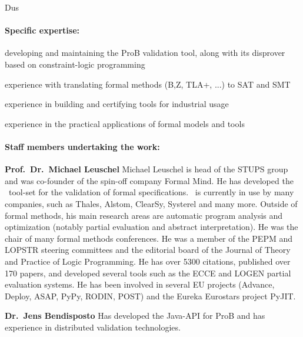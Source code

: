 \begin{sitedescription}{Dus}
\paragraph{Specific expertise:}

\begin{compactitem}
\item {}
      developing and maintaining the ProB validation tool, along with
      its disprover based on constraint-logic programming
 \item experience with translating formal methods (B,Z, TLA+, ...)
       to SAT and SMT
 \item experience in building and certifying tools for industrial usage
 \item experience in the practical applications of formal models and tools
\end{compactitem}

\paragraph{Staff members undertaking the work:}

\textbf{Prof.\ Dr.\ Michael Leuschel}
Michael Leuschel is head of the STUPS group and was co-founder of the spin-off
company Formal Mind.
He has developed the \prob\ tool-set for the validation of formal specifications.
\prob\ is currently in use by many companies, such as Thales, Alstom, ClearSy, Systerel 
and many more.
Outside of formal methods, his main research areas are automatic program analysis and optimization (notably partial evaluation and abstract interpretation).
He was the chair of many formal methods conferences.
He was a member of the PEPM and LOPSTR steering committees and
 the editorial board of the Journal of Theory and Practice of Logic Programming.
He has over 5300 citations, published over 170 papers, 
and developed several tools such as the ECCE and LOGEN partial evaluation systems.
He has been involved in several EU projects (Advance, Deploy, ASAP, PyPy, RODIN, POST) and the Eureka Eurostars project PyJIT.

\textbf{Dr.\ Jens Bendisposto}
Has developed the Java-API for ProB and has experience in distributed validation technologies.



\end{sitedescription}

